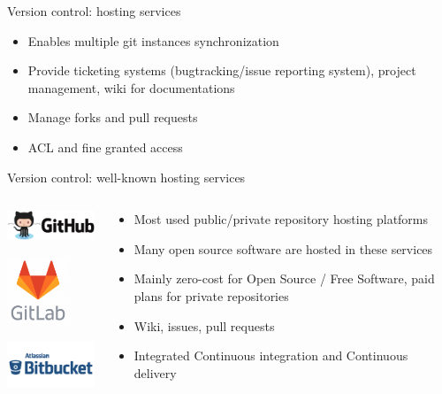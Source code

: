 \begin{frame}[fragile]{Version control: hosting services}
\begin{itemize}
  \item Enables multiple git instances synchronization
  \item Provide ticketing systems (bugtracking/issue reporting system), project
  management, wiki for documentations
  \item Manage forks and pull requests
  \item ACL and fine granted access
\end{itemize}
\end{frame}


\begin{frame}[fragile]{Version control: well-known hosting services}


\begin{columns}
\begin{column}{0.5\textwidth}
  \begin{center}
  \includegraphics[width=10em]{github-logo}

  \includegraphics[width=5em]{gitlab-logo}

  \includegraphics[width=10em]{bitbucket-logo}
  \end{center}
\end{column}
\begin{column}{0.5\textwidth}
  \begin{itemize}
    \item Most used public/private repository hosting platforms
    \item Many open source software are hosted in these services
    \item Mainly zero-cost for Open Source / Free Software, paid plans for private repositories
    \item Wiki, issues, pull requests
    \item Integrated Continuous integration and Continuous delivery
  \end{itemize}
\end{column}
\end{columns}

\end{frame}

